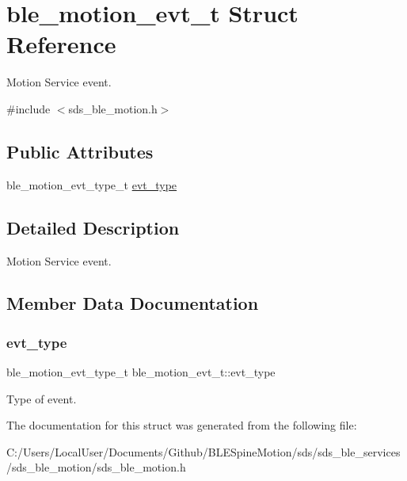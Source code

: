 \hypertarget{structble__motion__evt__t}{}\section{ble\+\_\+motion\+\_\+evt\+\_\+t Struct Reference}
\label{structble__motion__evt__t}


Motion Service event.  




{\ttfamily \#include $<$sds\+\_\+ble\+\_\+motion.\+h$>$}

\subsection*{Public Attributes}
\begin{DoxyCompactItemize}
\item 
ble\+\_\+motion\+\_\+evt\+\_\+type\+\_\+t \mbox{\hyperlink{structble__motion__evt__t_aa747271af32df41522434dc4c7e67c33}{evt\+\_\+type}}
\end{DoxyCompactItemize}


\subsection{Detailed Description}
Motion Service event. 

\subsection{Member Data Documentation}
\mbox{\label{structble__motion__evt__t_aa747271af32df41522434dc4c7e67c33}} 
\subsubsection{\texorpdfstring{evt\_type}{evt\_type}}
{\footnotesize\ttfamily ble\+\_\+motion\+\_\+evt\+\_\+type\+\_\+t ble\+\_\+motion\+\_\+evt\+\_\+t\+::evt\+\_\+type}

Type of event. 

The documentation for this struct was generated from the following file\+:\begin{DoxyCompactItemize}
\item 
C\+:/\+Users/\+Local\+User/\+Documents/\+Github/\+B\+L\+E\+Spine\+Motion/sds/sds\+\_\+ble\+\_\+services/sds\+\_\+ble\+\_\+motion/sds\+\_\+ble\+\_\+motion.\+h\end{DoxyCompactItemize}
